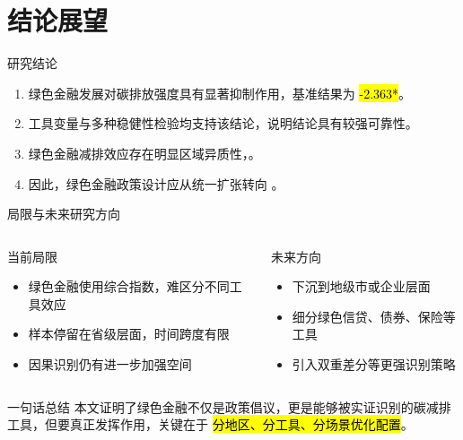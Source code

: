 \section{结论展望}

\begin{frame}{研究结论}
  \begin{enumerate}
    \item 绿色金融发展对碳排放强度具有显著抑制作用，基准结果为 \hl{-2.363*}。
    \item 工具变量与多种稳健性检验均支持该结论，说明结论具有较强可靠性。
    \item 绿色金融减排效应存在明显区域异质性，。
    \item 因此，绿色金融政策设计应从统一扩张转向 。
  \end{enumerate}
\end{frame}

\begin{frame}{局限与未来研究方向}
  \begin{columns}[T,onlytextwidth]
    \begin{block}{当前局限}
      \begin{itemize}
        \item 绿色金融使用综合指数，难区分不同工具效应
        \item 样本停留在省级层面，时间跨度有限
        \item 因果识别仍有进一步加强空间
      \end{itemize}
    \end{block}

    \begin{exampleblock}{未来方向}
      \begin{itemize}
        \item 下沉到地级市或企业层面
        \item 细分绿色信贷、债券、保险等工具
        \item 引入双重差分等更强识别策略
      \end{itemize}
    \end{exampleblock}
  \end{columns}

  \vspace{0.6em}
  \begin{alertblock}{一句话总结}
    本文证明了绿色金融不仅是政策倡议，更是能够被实证识别的碳减排工具，但要真正发挥作用，关键在于 \hl{分地区、分工具、分场景优化配置}。
  \end{alertblock}
\end{frame}
